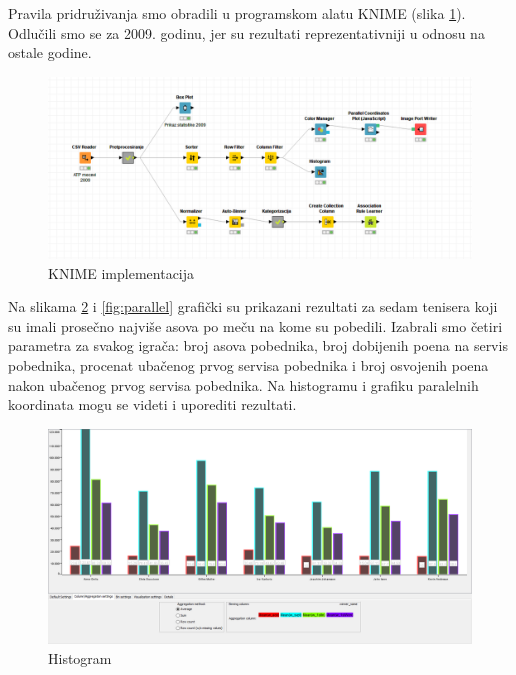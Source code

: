 \documentclass[a4paper]{article}
\begin{document}
Pravila pridruživanja smo obradili u programskom alatu KNIME (slika \ref{fig:knime}).
Odlučili smo se za 2009. godinu, jer su rezultati reprezentativniji u odnosu na ostale godine.

\begin{figure}[h!]
	\begin{center}
		\includegraphics[scale=0.37]{KNIME_project/PravilaPridruzivanja/knime.png}
	\end{center}
	\caption{KNIME implementacija}
	\label{fig:knime}
\end{figure}

Na slikama \ref{fig:histogram} i \ref{fig:parallel} grafički su prikazani rezultati za sedam
tenisera koji su imali prosečno najviše asova po meču na kome su pobedili. Izabrali smo četiri parametra za svakog igrača:
broj asova pobednika, broj dobijenih poena na servis pobednika, procenat ubačenog prvog servisa pobednika i
broj osvojenih poena nakon ubačenog prvog servisa pobednika. Na histogramu i grafiku paralelnih koordinata 
mogu se videti i uporediti rezultati.

\begin{figure}[H]
	\begin{center}
		\includegraphics[scale=0.25]{KNIME_project/PravilaPridruzivanja/histogram2009}
	\end{center}
	\caption{Histogram}
	\label{fig:histogram}
\end{figure}
\end{document}
